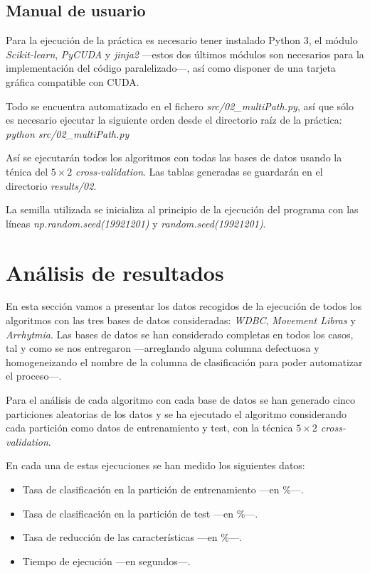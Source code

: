 \documentclass[a4paper, 11pt, titlepage]{article}
\begin{document}
    \subsection{Manual de usuario}
    Para la ejecución de la práctica es necesario tener instalado Python 3, el módulo \emph{Scikit-learn}, \emph{PyCUDA} y \emph{jinja2} ---estos dos últimos módulos son necesarios para la implementación del código paralelizado---, así como disponer de una tarjeta gráfica compatible con CUDA.

    Todo se encuentra automatizado en el fichero \emph{src/02\_multiPath.py}, así que sólo es necesario ejecutar la siguiente orden desde el directorio raíz de la práctica: \emph{python src/02\_multiPath.py}

    Así se ejecutarán todos los algoritmos con todas las bases de datos usando la ténica del  $5\times2$ \emph{cross-validation}. Las tablas generadas se guardarán en el directorio \emph{results/02}.

    La semilla utilizada se inicializa al principio de la ejecución del programa con las líneas \emph{np.random.seed(19921201)} y \emph{random.seed(19921201)}.


    \section{Análisis de resultados}

    En esta sección vamos a presentar los datos recogidos de la ejecución de todos los algoritmos con las tres bases de datos consideradas: \emph{WDBC}, \emph{Movement Libras} y \emph{Arrhytmia}. Las bases de datos se han considerado completas en todos los casos, tal y como se nos entregaron ---arreglando alguna columna defectuosa y homogeneizando el nombre de la columna de clasificación para poder automatizar el proceso---.

    Para el análisis de cada algoritmo con cada base de datos se han generado cinco particiones aleatorias de los datos y se ha ejecutado el algoritmo considerando cada partición como datos de entrenamiento y test, con la técnica \emph{$5\times2$ cross-validation}.

    En cada una de estas ejecuciones se han medido los siguientes datos:
    \begin{itemize}
        \item Tasa de clasificación en la partición de entrenamiento ---en \%---.
        \item Tasa de clasificación en la partición de test ---en \%---.
        \item Tasa de reducción de las características ---en \%---.
        \item Tiempo de ejecución ---en segundos---.
    \end{itemize}
\end{document}
